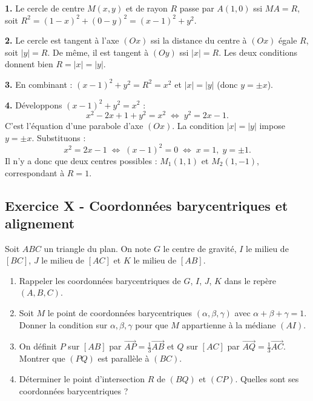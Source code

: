 \documentclass[12pt,a4paper]{article}
\begin{document}
\begin{boitecorrige}
\textbf{1.} Le cercle de centre $M(x,y)$ et de rayon $R$ passe par $A(1,0)$ ssi $MA = R$, soit $R^2 = (1-x)^2 + (0-y)^2 = (x-1)^2 + y^2$.

\textbf{2.} Le cercle est tangent à l'axe $(Ox)$ ssi la distance du centre à $(Ox)$ égale $R$, soit $|y| = R$. De même, il est tangent à $(Oy)$ ssi $|x| = R$. Les deux conditions donnent bien $R = |x| = |y|$.

\textbf{3.} En combinant : $(x-1)^2 + y^2 = R^2 = x^2$ et $|x| = |y|$ (donc $y = \pm x$).

\textbf{4.} Développons $(x-1)^2 + y^2 = x^2$ :
\[
x^2 - 2x + 1 + y^2 = x^2 \;\Longleftrightarrow\; y^2 = 2x - 1.
\]
C'est l'équation d'une parabole d'axe $(Ox)$. La condition $|x| = |y|$ impose $y = \pm x$. Substituons :
\[
x^2 = 2x - 1 \;\Longleftrightarrow\; (x-1)^2 = 0 \;\Longleftrightarrow\; x = 1,\; y = \pm 1.
\]
Il n'y a donc que deux centres possibles : $M_1(1, 1)$ et $M_2(1, -1)$, correspondant à $R = 1$.

\end{boitecorrige}

\subsection*{Exercice X - Coordonnées barycentriques et alignement \niveau{\difficile}}

\begin{boiteexercice}
Soit $ABC$ un triangle du plan. On note $G$ le centre de gravité, $I$ le milieu de $[BC]$, $J$ le milieu de $[AC]$ et $K$ le milieu de $[AB]$.
\begin{enumerate}
  \item Rappeler les coordonnées barycentriques de $G$, $I$, $J$, $K$ dans le repère $(A, B, C)$.
  \item Soit $M$ le point de coordonnées barycentriques $(\alpha, \beta, \gamma)$ avec $\alpha+\beta+\gamma=1$. Donner la condition sur $\alpha, \beta, \gamma$ pour que $M$ appartienne à la médiane $(AI)$.
  \item On définit $P$ sur $[AB]$ par $\overrightarrow{AP} = \tfrac{1}{3}\overrightarrow{AB}$ et $Q$ sur $[AC]$ par $\overrightarrow{AQ} = \tfrac{1}{3}\overrightarrow{AC}$. Montrer que $(PQ)$ est parallèle à $(BC)$.
  \item Déterminer le point d'intersection $R$ de $(BQ)$ et $(CP)$. Quelles sont ses coordonnées barycentriques ?
\end{enumerate}
\end{boiteexercice}
\end{document}
